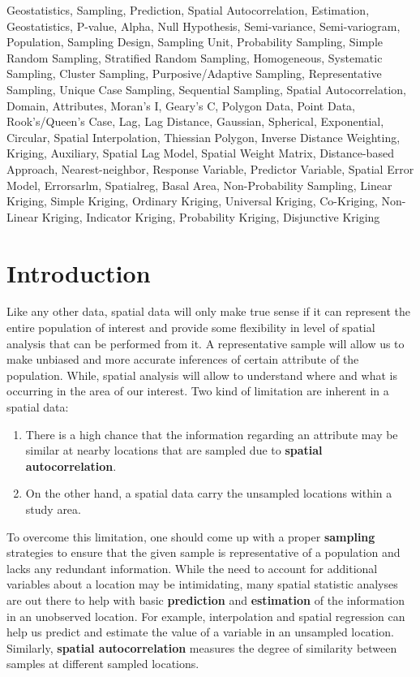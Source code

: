 \documentclass[
]{book}
\begin{document}
Geostatistics, Sampling, Prediction, Spatial Autocorrelation, Estimation, Geostatistics, P-value, Alpha, Null Hypothesis, Semi-variance, Semi-variogram, Population, Sampling Design, Sampling Unit, Probability Sampling, Simple Random Sampling, Stratified Random Sampling, Homogeneous, Systematic Sampling, Cluster Sampling, Purposive/Adaptive Sampling, Representative Sampling, Unique Case Sampling, Sequential Sampling, Spatial Autocorrelation, Domain, Attributes, Moran's I, Geary's C, Polygon Data, Point Data, Rook's/Queen's Case, Lag, Lag Distance, Gaussian, Spherical, Exponential, Circular, Spatial Interpolation, Thiessian Polygon, Inverse Distance Weighting, Kriging, Auxiliary, Spatial Lag Model, Spatial Weight Matrix, Distance-based Approach, Nearest-neighbor, Response Variable, Predictor Variable, Spatial Error Model, Errorsarlm, Spatialreg, Basal Area, Non-Probability Sampling, Linear Kriging, Simple Kriging, Ordinary Kriging, Universal Kriging, Co-Kriging, Non-Linear Kriging, Indicator Kriging, Probability Kriging, Disjunctive Kriging

\hypertarget{introduction}{%
\section{Introduction}\label{introduction}}

Like any other data, spatial data will only make true sense if it can represent the entire population of interest and provide some flexibility in level of spatial analysis that can be performed from it. A representative sample will allow us to make unbiased and more accurate inferences of certain attribute of the population. While, spatial analysis will allow to understand where and what is occurring in the area of our interest. Two kind of limitation are inherent in a spatial data:

\begin{enumerate}
\def\labelenumi{\arabic{enumi}.}
\item
  There is a high chance that the information regarding an attribute may be similar at nearby locations that are sampled due to \textbf{spatial autocorrelation}.
\item
  On the other hand, a spatial data carry the unsampled locations within a study area.
\end{enumerate}

To overcome this limitation, one should come up with a proper \textbf{sampling} strategies to ensure that the given sample is representative of a population and lacks any redundant information. While the need to account for additional variables about a location may be intimidating, many spatial statistic analyses are out there to help with basic \textbf{prediction} and \textbf{estimation} of the information in an unobserved location. For example, interpolation and spatial regression can help us predict and estimate the value of a variable in an unsampled location. Similarly, \textbf{spatial autocorrelation} measures the degree of similarity between samples at different sampled locations.
\end{document}
